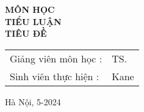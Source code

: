 \begin{titlepage}
\begin{center}
\fontsize{25pt}{0pt}\selectfont \textbf{MÔN HỌC} \\ \vspace{0.7cm}
\fontsize{18pt}{0pt}\selectfont \textbf{TIỂU LUẬN} \\ \vspace{10pt}
\fontsize{18pt}{0pt}\selectfont \textbf{TIÊU ĐỀ} \\ \vspace{2cm}


\begin{table}[H]
    \centering
    \begin{tabular}{l l}
        \fontsize{14pt}{0pt}\selectfont Giảng viên môn học \hspace{0.68cm}: & \fontsize{14pt}{0pt}\selectfont TS. \\
    
        \fontsize{14pt}{0pt}\selectfont Sinh viên thực hiện \hspace{0.748cm} :  & \fontsize{14pt}{0pt}\selectfont Kane \\
    \end{tabular}
\end{table}


\vspace{0.75cm} \fontsize{14pt}{0pt}\selectfont Hà Nội, 5-2024

\end{center}

\end{titlepage}
